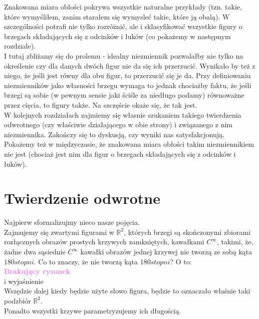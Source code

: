 \documentclass[a4paper, 12pt]{article}
\newcommand{\rysunek}[1]{\hfill \break\\[16pt] \Huge \textbf{\textcolor{violet}{Brakujący rysunek \normalsize
#1}} \hfill
\break \\[16pt] \normalsize}
\begin{document}
 Znakowana miara obłości pokrywa wszystkie naturalne przykłady (tzn. takie, które wymyśliłem, zanim starałem
 się wymysleć takie, które ją obalą). W szczególności potrafi nie tylko rozróżnić, ale i sklasyfikować
 wszystkie figury o brzegach składających się z odcinków i łuków (co pokażemy w następnym rozdziale). \\
 I tutaj zbliżamy się do prolemu - idealny niezmiennik pozwalałby nie tylko na określenie czy dla danych
 dwóch figur nie da się ich przerzucić. Wynikało by też z niego, że jeśli jest równy dla obu figur, to
 przerzucić się je da. Przy definiowaniu niezmienników jako własności brzegu wymaga to jednak chociażby
 faktu, że jeśli brzegi są sobie (w pewnym sensie jaki ściśle za niedługo podamy) równoważne przez cięcia,
 to figury także. Na szczęście okaże się, że tak jest. \\
 W kolejnych rozdziałach zajmiemy się własnie szukaniem takiego twierdzenia odwrotnego (czy właściwie
 działającego w obie strony) i związanego z nim niezmiennika. Zakończy się to dyskusją, czy wyniki nas
 satysfakcjonują. \\
 Pokażemy też w międzyczasie, że znakowana miara obłości takim niezmiennikiem nie jest (chociaż jest nim
 dla figur o brzegach składających się z odcinków i łuków).
\section{Twierdzenie odwrotne}
Najpierw sformalizujmy nieco nasze pojęcia. \\
Zajmujemy się zwartymi figurami w $\mathbb{R}^2$, których brzegi są skończonymi zbiorami rozłącznych obrazów
prostych krzywych
zamkniętych, kawałkami $C^\infty$, takimi, że, żadne dwa sąsiednie $C^\infty$
kawałki obrazów jednej krzywej
nie tworzą ze sobą kąta $180 stopni$. Co to znaczy, że nie tworzą kąta $180 stopni$? O to:
\rysunek{}
i wyjaśnienie \\

Wszędzie dalej kiedy będzie użyte słowo figura, będzie to oznaczało właśnie taki podzbiór $\mathbb{R}^2$. \\
Ponadto wszystki krzywe parametryzujemy ich długością.
\end{document}
